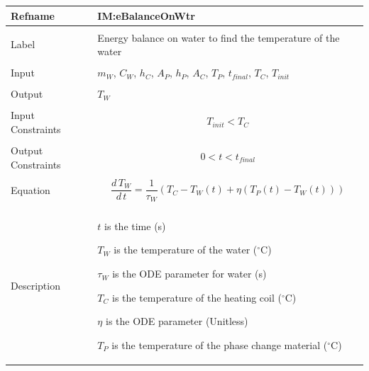 \documentclass[12pt]{article}
\begin{document}
\noindent \begin{minipage}{\textwidth}
\begin{tabular}{p{} p{}}
\toprule \textbf{Refname} & \textbf{IM:eBalanceOnWtr}
\label{IM:eBalanceOnWtr}
\\ \midrule \\
Label & Energy balance on water to find the temperature of the water
\\ \midrule \\
Input & ${m_{W}}$, ${C_{W}}$, ${h_{C}}$, ${A_{P}}$, ${h_{P}}$, ${A_{C}}$, ${T_{P}}$, ${t_{final}}$, ${T_{C}}$, ${T_{init}}$
\\ \midrule \\
Output & ${T_{W}}$
\\ \midrule \\
Input Constraints & \begin{displaymath}
                    {T_{init}}<{T_{C}}
                    \end{displaymath}
\\ \midrule \\
Output Constraints & \begin{displaymath}
                     0<t<{t_{final}}
                     \end{displaymath}
\\ \midrule \\
Equation & \begin{displaymath}
           \frac{d\,{T_{W}}}{d\,t}=\frac{1}{{τ_{W}}} \left({T_{C}}-{T_{W}}\left(t\right)+η \left({T_{P}}\left(t\right)-{T_{W}}\left(t\right)\right)\right)
           \end{displaymath}
\\ \midrule \\
Description & \begin{symbDescription}
              \item{$t$ is the time (s)}
              \item{${T_{W}}$ is the temperature of the water (${}^{\circ}$C)}
              \item{${τ_{W}}$ is the ODE parameter for water (s)}
              \item{${T_{C}}$ is the temperature of the heating coil (${}^{\circ}$C)}
              \item{$η$ is the ODE parameter (Unitless)}
              \item{${T_{P}}$ is the temperature of the phase change material (${}^{\circ}$C)}
              \end{symbDescription}

\end{tabular}
\end{minipage}
\end{document}
